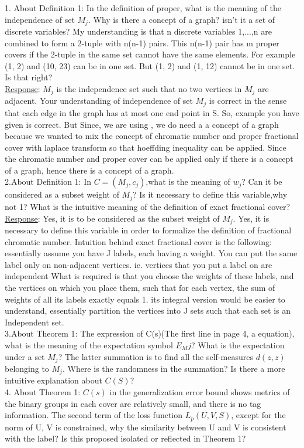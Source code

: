 \documentclass{article}
\begin{document}
1. About Definition 1: In the definition of proper, what is the meaning of the independence of set $M_j$. Why is there a concept of a graph? isn't it a set of discrete variables? My understanding is that n discrete variables {1,...,n} are combined to form a 2-tuple with n(n-1) pairs. This n(n-1) pair has m proper covers if the 2-tuple in the same set cannot have the same elements. For example (1, 2) and (10, 23) can be in one set. But (1, 2) and (1, 12) cannot be in one set. Is that right?\\

\underline{Response}: $M_j$ is the independence set such that no two vertices in $M_j$ are adjacent. Your understanding of independence of set $M_j$ is correct in the sense that each edge in the graph has at most one end point in S. So, example you have given is correct. But Since, we are using \cite{Janson04RSA}, we do need a a concept of a graph because we wanted to mix the concept of chromatic number and proper fractional cover  with laplace transform so that hoeffding inequality can be applied. Since the chromatic number and proper cover can be applied only if there is a concept of a graph, hence there is a concept of a graph.\\


2.About Definition 1: In $C={(M_j,c_j)}$,what is the meaning of $w_j$? Can it be considered as a subset weight of $M_j$? Is it necessary to define this variable,why not 1? What is the intuitive meaning of the definition of exact fractional cover?\\

\underline{Response}: Yes, it is to be considered as the subset weight of $M_j$. Yes, it is necessary to define this variable in order to formalize the definition of fractional chromatic number. Intuition behind exact fractional cover is the following: essentially assume you have J labels, each having a weight.
You can put the same label only on non-adjacent vertices. ie. vertices that you put a label on are independent
What is required is that you choose the weights of these labels, and the vertices on which you place them, such that 
for each vertex, the sum of weights of all its labels exactly equals 1. its integral version would be easier to understand, essentially partition the vertices into J sets such that each set is an Independent set.\\


3.About Theorem 1: The expression of C(s)(The first line in page 4, a equation), what is the meaning of the expectation symbol $E_Mj$? What is the expectation under a set $M_j$? The latter summation is to find all the self-measures $d(z,z)$ belonging to $M_j$. Where is the randomness in the summation? Is there a more intuitive explanation about $C(S)$?\\

4. About Theorem 1: $C(s)$ in the generalization error bound shows metrics of the binary groups in each cover are relatively small, and there is no tag information. The second term of the loss function $L_p(U,V,S)$, except for the norm of U, V is constrained, why the similarity between U and V is consistent with the label? Is this proposed isolated or reflected in Theorem 1?



\end{document}
